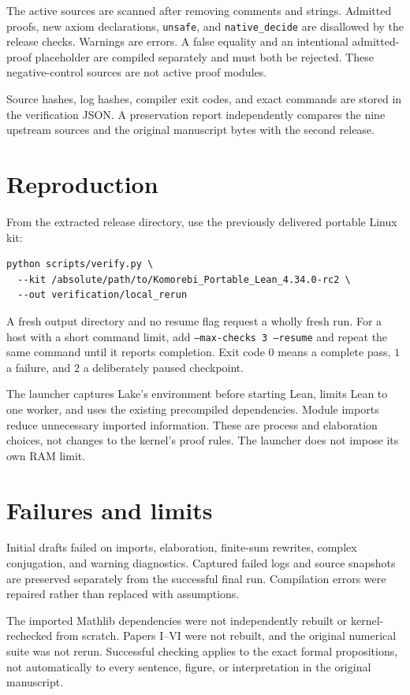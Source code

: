 \documentclass[10pt,letterpaper]{article}
\newcommand{\code}[1]{\texttt{\small #1}}
\begin{document}
The active sources are scanned after removing comments and strings. Admitted proofs, new axiom declarations, \code{unsafe}, and \code{native\_decide} are disallowed by the release checks. Warnings are errors. A false equality and an intentional admitted-proof placeholder are compiled separately and must both be rejected. These negative-control sources are not active proof modules.

Source hashes, log hashes, compiler exit codes, and exact commands are stored in the verification JSON. A preservation report independently compares the nine upstream sources and the original manuscript bytes with the second release.

\section*{Reproduction}
From the extracted release directory, use the previously delivered portable Linux kit:
\begin{verbatim}
python scripts/verify.py \
  --kit /absolute/path/to/Komorebi_Portable_Lean_4.34.0-rc2 \
  --out verification/local_rerun
\end{verbatim}
A fresh output directory and no resume flag request a wholly fresh run. For a host with a short command limit, add \code{--max-checks 3 --resume} and repeat the same command until it reports completion. Exit code $0$ means a complete pass, $1$ a failure, and $2$ a deliberately paused checkpoint.

The launcher captures Lake's environment before starting Lean, limits Lean to one worker, and uses the existing precompiled dependencies. Module imports reduce unnecessary imported information. These are process and elaboration choices, not changes to the kernel's proof rules. The launcher does not impose its own RAM limit.

\section*{Failures and limits}
Initial drafts failed on imports, elaboration, finite-sum rewrites, complex conjugation, and warning diagnostics. Captured failed logs and source snapshots are preserved separately from the successful final run. Compilation errors were repaired rather than replaced with assumptions.

The imported Mathlib dependencies were not independently rebuilt or kernel-rechecked from scratch. Papers I--VI were not rebuilt, and the original numerical suite was not rerun. Successful checking applies to the exact formal propositions, not automatically to every sentence, figure, or interpretation in the original manuscript.
\end{document}
